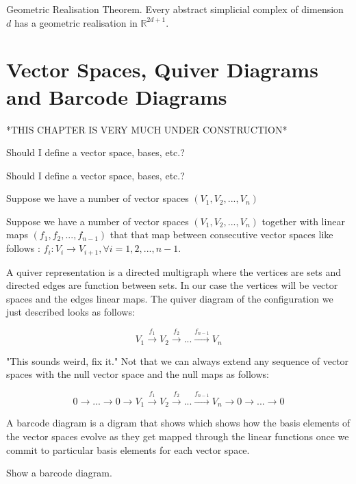 

\begin{thm} Geometric Realisation Theorem. Every abstract simplicial complex of dimension $d$ has a geometric realisation in $\mathbb{R}^{2d+1}.$   \end{thm}



\section{Vector Spaces, Quiver Diagrams and Barcode Diagrams}

*THIS CHAPTER IS VERY MUCH UNDER CONSTRUCTION*

Should I define a vector space, bases, etc.?

Should I define a vector space, bases, etc.?


Suppose we have a number of vector spaces $(V_1, V_2, ...,V_n)$

Suppose we have a number of vector spaces $(V_1, V_2, ...,V_n)$ together with linear maps $(f_1, f_2, ...,f_{n-1})$ that that map between consecutive vector spaces like follows : $f_i: V_i \to V_{i+1}, \forall i = 1, 2, ..., n -1$. 

A quiver representation is a directed multigraph where the vertices are sets and directed edges are function between sets. In our case the vertices will be vector spaces and the edges linear maps. The quiver diagram of the configuration we just described looks as follows:

$$V_1 \overset{f_1}{\longrightarrow} V_2 \overset{f_2}{\longrightarrow} ... \overset{f_{n-1}}{\longrightarrow} V_n  $$


"This sounds weird, fix it."
Not that we can always extend any sequence of vector spaces with the null vector space and the null maps as follows:

$$ 0 \longrightarrow ... \longrightarrow 0 \longrightarrow V_1 \overset{f_1}{\longrightarrow} V_2 \overset{f_2}{\longrightarrow} ... \overset{f_{n-1}}{\longrightarrow} V_n  \longrightarrow 0 \longrightarrow ... \longrightarrow 0$$

A barcode diagram is a digram that shows which shows how the basis elements of the vector spaces evolve as they get mapped through the linear functions once we commit to particular basis elements for each vector space.

Show a barcode diagram.

